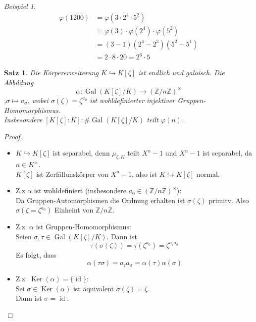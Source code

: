 \documentclass[10pt,a4paper]{article}
\newcommand{\Z}{\ensuremath{\mathbb{Z}}}
\newcommand{\al}{\ensuremath{\alpha}}
\newcommand{\Ker}{\ensuremath{\operatorname{Ker}}}
\newcommand{\id}{\operatorname{id}}
\newcommand{\Gal}{\ensuremath{\operatorname{Gal}}}
\newcounter{thm}[section]
\theoremstyle{definition}
\theoremstyle{plain}
\newtheorem{satz}[thm]{Satz}
\theoremstyle{remark}
\newtheorem*{exm*}{Beispiel}
\begin{document}
\begin{exm*}
	\begin{align*}
	\varphi(1200)&=\varphi(3\cdot2^4\cdot 5^2)\\
	&=\varphi(3)\cdot\varphi(2^4)\cdot\varphi(5^2)\\
	&=(3-1)(2^4-2^3)(5^2-5^1)\\
	&=2\cdot8\cdot 20=2^6\cdot 5
	\end{align*}
\end{exm*}


\begin{satz}\label{1110satz}
	Die Körpererweiterung $K\hookrightarrow K[\zeta]$ ist endlich und galoisch. Die Abbildung
	$$\al:\Gal(K[\zeta]/K)\to(\Z/n\Z)^\times$$,$\sigma\mapsto a_\sigma$, wobei $\sigma(\zeta)=\zeta^{a_0}$ ist wohldefinierter injektiver Gruppen-Homomorphismus.\\
	Insbesondere $[K[\zeta]:K]:\#\Gal(K[\zeta]/K)$ teilt $\varphi(n)$.
\end{satz}
\begin{proof}
	\begin{itemize}
		\item $K\hookrightarrow K[\zeta]$ ist separabel, denn $\mu_{\zeta,K}$ teilt $X^n-1$ und $X^n-1$ ist separabel, da $n\in K^\times$.\\
		$K[\zeta]$ ist Zerfällunskörper von $X^n-1$, also ist $K\hookrightarrow K[\zeta]$ normal.
		\item Z.z $\al$ ist wohldefiniert (insbesondere $a_0\in(\Z/n\Z)^\times$):\\
		Da Gruppen-Automorphismen die Ordnung erhalten ist $\sigma(\zeta)$ primitv. Also $\sigma(\zeta=\zeta^{a_0})$ Einheint von $\Z/n\Z$.
		\item Z.z. $\al$ ist Gruppen-Homomorphismus:\\
		Seien $\sigma,\tau\in\Gal(K[\zeta]/K)$. Dann ist
		\[\tau(\sigma(\zeta))=\tau(\zeta^{a_0})=\zeta^{a_\tau a_\sigma}\]
		Es folgt, dass
		\[\al(\tau\sigma)=a_\tau a_\sigma=\al(\tau)\al(\sigma)\]
		\item Z.z. $\Ker(\al)=\{\id\}$:\\
		Sei $\sigma\in\Ker(\al)$ ist äquivalent $\sigma(\zeta)=\zeta$.\\
		Dann ist $\sigma=\id$.
	\end{itemize}
\end{proof}
\end{document}
